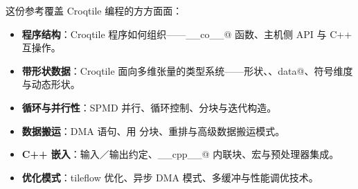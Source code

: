 这份参考覆盖 Croqtile 编程的方方面面：

\begin{itemize}[leftmargin=1.6em]
\item \textbf{程序结构}：Croqtile 程序如何组织——\co@__co__@ 函数、主机侧 API 与 C++ 互操作。
\end{itemize}

\begin{itemize}[leftmargin=1.6em]
\item \textbf{带形状数据}：Croqtile 面向多维张量的类型系统——形状、\co@MDSpan@、\co@spanned data@、符号维度与动态形状。
\end{itemize}

\begin{itemize}[leftmargin=1.6em]
\item \textbf{循环与并行性}：SPMD 并行、循环控制、分块与迭代构造。
\end{itemize}

\begin{itemize}[leftmargin=1.6em]
\item \textbf{数据搬运}：DMA 语句、用 \co@chunkat@ 分块、重排与高级数据搬运模式。
\end{itemize}

\begin{itemize}[leftmargin=1.6em]
\item \textbf{C++ 嵌入}：输入／输出约定、\co@__cpp__@ 内联块、宏与预处理器集成。
\end{itemize}

\begin{itemize}[leftmargin=1.6em]
\item \textbf{优化模式}：tileflow 优化、异步 DMA 模式、多缓冲与性能调优技术。
\end{itemize}
